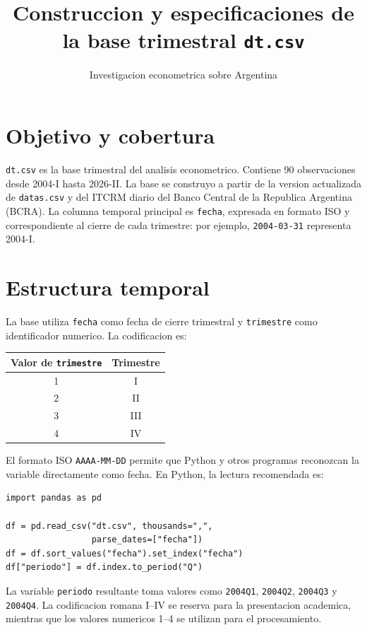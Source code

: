 \documentclass[12pt,a4paper]{article}
\title{Construccion y especificaciones de la base trimestral \texttt{dt.csv}}
\author{Investigacion econometrica sobre Argentina}
\date{}
\begin{document}
\maketitle

\section{Objetivo y cobertura}

\texttt{dt.csv} es la base trimestral del analisis econometrico. Contiene 90 observaciones desde 2004-I hasta 2026-II. La base se construyo a partir de la
version actualizada de \texttt{datas.csv} y del ITCRM diario del Banco Central
de la Republica Argentina (BCRA). La columna temporal principal es
\texttt{fecha}, expresada en formato ISO y correspondiente al cierre de cada
trimestre: por ejemplo, \texttt{2004-03-31} representa 2004-I.

\section{Estructura temporal}

La base utiliza \texttt{fecha} como fecha de cierre trimestral y
\texttt{trimestre} como identificador numerico. La codificacion es:

\begin{center}
\begin{tabular}{cc}
\toprule
\textbf{Valor de \texttt{trimestre}} & \textbf{Trimestre}\\
\midrule
1 & I\\
2 & II\\
3 & III\\
4 & IV\\
\bottomrule
\end{tabular}
\end{center}

El formato ISO \texttt{AAAA-MM-DD} permite que Python y otros programas
reconozcan la variable directamente como fecha. En Python, la lectura
recomendada es:

\begin{verbatim}
import pandas as pd

df = pd.read_csv("dt.csv", thousands=",",
                 parse_dates=["fecha"])
df = df.sort_values("fecha").set_index("fecha")
df["periodo"] = df.index.to_period("Q")
\end{verbatim}

La variable \texttt{periodo} resultante toma valores como \texttt{2004Q1},
\texttt{2004Q2}, \texttt{2004Q3} y \texttt{2004Q4}. La codificacion romana
I--IV se reserva para la presentacion academica, mientras que los valores
numericos 1--4 se utilizan para el procesamiento.
\end{document}
